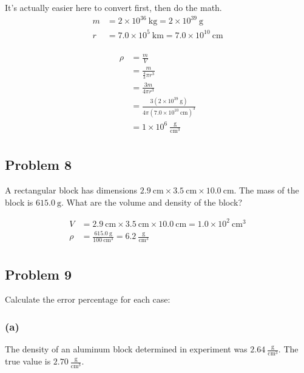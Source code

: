 \documentclass[11pt]{scrartcl}
\begin{document}
\noindent It's actually easier here to convert first, then do the math.
\begin{align*}
    m &= 2 \times 10^{36}\ \text{kg} = 2 \times 10^{39}\ \text{g} \\
    r &= 7.0 \times 10^{5}\ \text{km} = 7.0 \times 10^{10}\ \text{cm} \\
\end{align*}

\begin{align*}
    \rho &= \frac{m}{V} \\
    &= \frac{m}{\frac{4}{3} \pi r^3} \\
    &= \frac{3m}{4 \pi r^3} \\
    &= \frac{3 \left (2 \times 10^{39}\ \text{g} \right)}{4 \pi \left (7.0 \times 10^{10}\ \text{cm} \right)^3} \\
    &= \boxed{1 \times 10^{6}\ \frac{\text{g}}{\text{cm}^3}} \\
\end{align*}

\newpage
\subsection{Problem 8}

A rectangular block has dimensions $2.9\ \text{cm} \times 3.5\ \text{cm} \times 10.0\ \text{cm}$.
The mass of the block is $615.0\ \text{g}$.
What are the volume and density of the block?

\begin{align*}
    V &= 2.9\ \text{cm} \times 3.5\ \text{cm} \times 10.0\ \text{cm} = \boxed{1.0 \times 10^{2}\ \text{cm}^3} \\
    \rho &= \frac{ 615.0 \ \text{g} }{100\ \text{cm}^3} = \boxed{6.2\ \frac{\text{g}}{\text{cm}^3}} \\
\end{align*}

\newpage
\subsection{Problem 9}
Calculate the error percentage for each case:

\subsubsection{(a)}
The density of an aluminum block determined in experiment was $2.64\ \frac{\text{g}}{\text{cm}^3}$. The true value is $2.70\ \frac{\text{g}}{\text{cm}^3}$.
\end{document}
